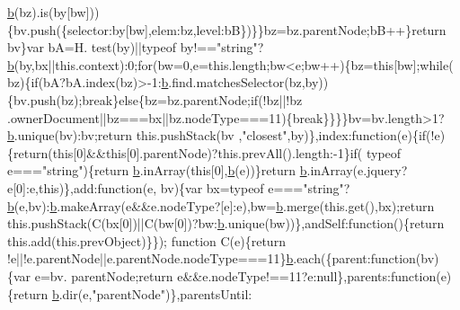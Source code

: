 \begin{DoxyCode}
      \hyperlink{a00039_aa4026ad5544b958e54ce5e106fa1c805}{b}(bz).is(by[bw]))\{bv.push(\{selector:by[bw],elem:bz,level:bB\})\}\}bz=bz.parentNode;bB++\}\textcolor{keywordflow}{return} bv\}var bA=H.
      test(by)||typeof by!==\textcolor{stringliteral}{"string"}?\hyperlink{a00039_aa4026ad5544b958e54ce5e106fa1c805}{b}(by,bx||this.context):0;\textcolor{keywordflow}{for}(bw=0,e=this.length;bw<e;bw++)\{bz=\textcolor{keyword}{this}[bw];\textcolor{keywordflow}{while}(
      bz)\{\textcolor{keywordflow}{if}(bA?bA.index(bz)>-1:\hyperlink{a00039_aa4026ad5544b958e54ce5e106fa1c805}{b}.find.matchesSelector(bz,by))\{bv.push(bz);\textcolor{keywordflow}{break}\}\textcolor{keywordflow}{else}\{bz=bz.parentNode;\textcolor{keywordflow}{if}(!bz||!bz
      .ownerDocument||bz===bx||bz.nodeType===11)\{\textcolor{keywordflow}{break}\}\}\}\}bv=bv.length>1?\hyperlink{a00039_aa4026ad5544b958e54ce5e106fa1c805}{b}.unique(bv):bv;\textcolor{keywordflow}{return} this.pushStack(bv
      ,\textcolor{stringliteral}{"closest"},by)\},index:\textcolor{keyword}{function}(e)\{\textcolor{keywordflow}{if}(!e)\{\textcolor{keywordflow}{return}(\textcolor{keyword}{this}[0]&&\textcolor{keyword}{this}[0].parentNode)?this.prevAll().length:-1\}\textcolor{keywordflow}{if}(
      typeof e===\textcolor{stringliteral}{"string"})\{\textcolor{keywordflow}{return} \hyperlink{a00039_aa4026ad5544b958e54ce5e106fa1c805}{b}.inArray(\textcolor{keyword}{this}[0],\hyperlink{a00039_aa4026ad5544b958e54ce5e106fa1c805}{b}(e))\}\textcolor{keywordflow}{return} \hyperlink{a00039_aa4026ad5544b958e54ce5e106fa1c805}{b}.inArray(e.jquery?e[0]:e,\textcolor{keyword}{this})\},add:\textcolor{keyword}{function}(e,
      bv)\{var bx=typeof e===\textcolor{stringliteral}{"string"}?\hyperlink{a00039_aa4026ad5544b958e54ce5e106fa1c805}{b}(e,bv):\hyperlink{a00039_aa4026ad5544b958e54ce5e106fa1c805}{b}.makeArray(e&&e.nodeType?[e]:e),bw=\hyperlink{a00039_aa4026ad5544b958e54ce5e106fa1c805}{b}.merge(this.get(),bx);\textcolor{keywordflow}{return} 
      this.pushStack(C(bx[0])||C(bw[0])?bw:\hyperlink{a00039_aa4026ad5544b958e54ce5e106fa1c805}{b}.unique(bw))\},andSelf:\textcolor{keyword}{function}()\{\textcolor{keywordflow}{return} this.add(this.prevObject)\}\});\textcolor{keyword}{
      function} C(e)\{\textcolor{keywordflow}{return} !e||!e.parentNode||e.parentNode.nodeType===11\}\hyperlink{a00039_aa4026ad5544b958e54ce5e106fa1c805}{b}.each(\{parent:\textcolor{keyword}{function}(bv)\{var e=bv.
      parentNode;\textcolor{keywordflow}{return} e&&e.nodeType!==11?e:null\},parents:\textcolor{keyword}{function}(e)\{\textcolor{keywordflow}{return} \hyperlink{a00039_aa4026ad5544b958e54ce5e106fa1c805}{b}.dir(e,\textcolor{stringliteral}{"parentNode"})\},parentsUntil:\textcolor{keyword}{
}
\end{DoxyCode}

